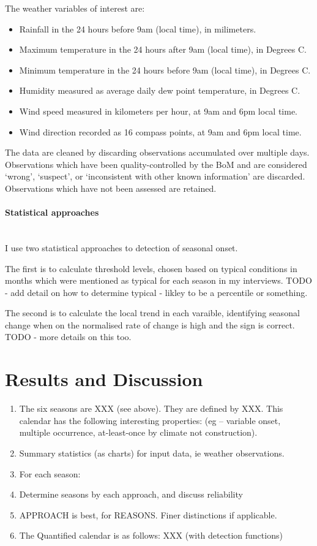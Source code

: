 The weather variables of interest are:
\begin{itemize}
\item Rainfall in the 24 hours before 9am (local time), in milimeters.
\item Maximum temperature in the 24 hours after 9am (local time), in Degrees C.
\item Minimum temperature in the 24 hours before 9am (local time), in Degrees C.
\item Humidity measured as average daily dew point temperature, in Degrees C.
\item Wind speed measured in kilometers per hour, at 9am and 6pm local time.
\item Wind direction recorded as 16 compass points, at 9am and 6pm local time.
\end{itemize}

The data are cleaned by discarding observations accumulated over multiple days.
Observations which have been quality-controlled by the BoM and are considered
`wrong', `suspect', or `inconsistent with other known information' are discarded.
Observations which have not been assessed are retained.


\paragraph{Statistical approaches}~\\
I use two statistical approaches to detection of seasonal onset.

The first is to calculate threshold levels, chosen based on typical conditions
in months which were mentioned as typical for each season in my interviews.
TODO - add detail on how to determine typical - likley to be a percentile or something.

The second is to calculate the local trend in each varaible, identifying seasonal
change when on the normalised rate of change is high and the sign is correct.
TODO - more details on this too.




\section{Results and Discussion}

\begin{enumerate}
\item The six seasons are XXX (see above).  They are defined by XXX.
        This calendar has the following interesting properties:
        (eg – variable onset, multiple occurrence, at-least-once by climate not construction).
\item Summary statistics (as charts) for input data, ie weather observations.
\item For each season:
\item Determine seasons by each approach, and discuss reliability
\item APPROACH is best, for REASONS.  Finer distinctions if applicable.
\item The Quantified calendar is as follows:  XXX (with detection functions)
\end{enumerate}

